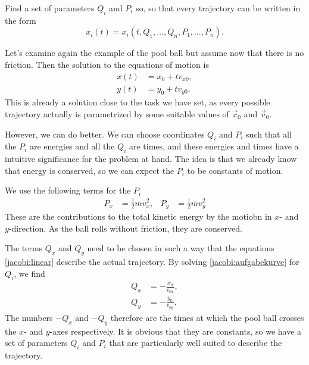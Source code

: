 \begin{aufgabe}
\label{jacobi:aufgabe}
Find a set of parameters 
$Q_i$ and $P_i$ so,
so that every trajectory can be written in the form
\begin{equation}
x_i(t) = x_i(t,Q_1,\dots,Q_n,P_1,\dots,P_n).
\label{jacobi:aufgabekurve}
\end{equation}
\end{aufgabe}

\begin{beispiel}
Let's examine again the example of the pool ball but assume now that
there is no friction.
Then the solution to the equations of motion is
\begin{equation}
\begin{aligned}
x(t)&=x_0 + tv_{x0},\\
y(t)&=y_0 + tv_{y0}.
\end{aligned}
\label{jacobi:linear}
\end{equation}
This is already a solution close to the task we have set, as every 
possible trajectory actually is parametrized by some suitable values
of $\vec{x}_0$ and $\vec{v}_0$.

However, we can do better.
We can choose coordinates $Q_i$ and $P_i$ such that all 
the $P_i$ are energies and all the $Q_i$ are times, and these
energies and times have a intuitive significance for the
problem at hand.
The idea is that we already know that energy is conserved, so
we can expect the $P_i$ to be constants of motion.

We use  the following terms for the $P_i$
\begin{equation*}
\begin{aligned}
P_x&=\frac12mv_x^2,&
P_y&=\frac12mv_y^2
\end{aligned}
\end{equation*}
These are the contributions to the total kinetic energy by the
motiobn in $x$- and $y$-direction.
As the ball rolls without friction, they are conserved.

The terms $Q_x$ and $Q_y$ need to be chosen in such a way that
the equations
\eqref{jacobi:linear}
describe the actual trajectory.
By solving \eqref{jacobi:aufgabekurve} for $Q_i$, we find
\begin{equation*}
\begin{aligned}
Q_x&=-\frac{x_0}{v_{0x}},\\
Q_y&=-\frac{y_0}{v_{0y}}.
\end{aligned}
\end{equation*}
The numbers $-Q_x$ and $-Q_y$ therefore are the times at which the pool
ball crosses the $x$- and $y$-axes respectively.
It is obvious that they are constants, so we have a set of parameters
$Q_i$ and $P_i$ that are particularly well suited to describe the
trajectory.
\end{beispiel}

